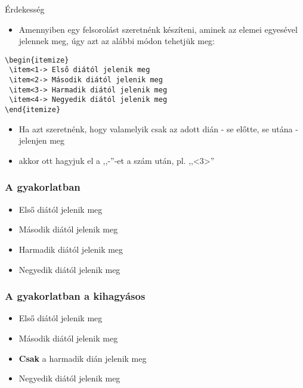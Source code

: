 \documentclass[11pt]{beamer}
\begin{document}
\begin{frame}[fragile]{Érdekesség}
\begin{itemize}
\item Amennyiben egy felsorolást szeretnénk készíteni, aminek az elemei egyesével jelennek meg, úgy azt az alábbi módon tehetjük meg:
\end{itemize}

\begin{verbatim}
\begin{itemize}
 \item<1-> Első diától jelenik meg
 \item<2-> Második diától jelenik meg
 \item<3-> Harmadik diától jelenik meg
 \item<4-> Negyedik diától jelenik meg
\end{itemize}
\end{verbatim}

\begin{itemize}
\item Ha azt szeretnénk, hogy valamelyik csak az adott dián - se előtte, se utána - jelenjen meg
\item akkor ott hagyjuk el a ,,-''-et a szám után, pl. ,,<3>''
\end{itemize}
\end{frame}

\begin{frame}
\frametitle{A gyakorlatban}
\begin{itemize}
 \item<1-> Első diától jelenik meg
 \item<2-> Második diától jelenik meg
 \item<3-> Harmadik diától jelenik meg
 \item<4-> Negyedik diától jelenik meg
\end{itemize}
\end{frame}

\begin{frame}
\frametitle{A gyakorlatban a kihagyásos}
\begin{itemize}
 \item<1-> Első diától jelenik meg
 \item<2-> Második diától jelenik meg
 \item<3> \textbf{Csak} a harmadik dián jelenik meg
 \item<4-> Negyedik diától jelenik meg
\end{itemize}
\end{frame}
\end{document}
